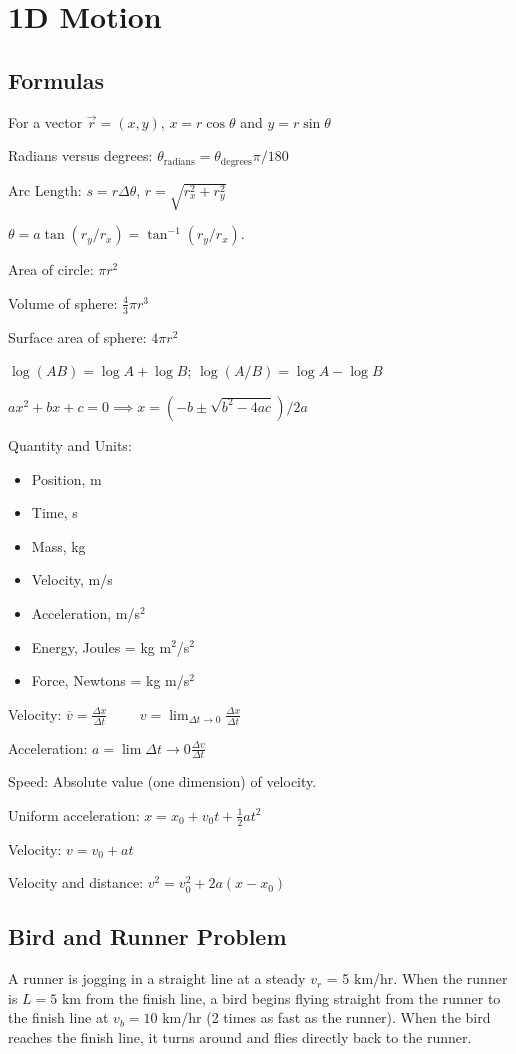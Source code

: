 \documentclass[../physics12.tex]{subfiles}
\begin{document}
\chapter{1D Motion}
\section{Formulas}
For a vector $\vec{r}=(x,y)$, $x=r\cos\theta$ and $y=r\sin\theta$

Radians versus degrees: $\theta_{\text{radians}}=\theta_{\text{degrees}}\pi/180$

Arc Length: $s=r\Delta \theta$, $r=\sqrt{r_x^2+r_y^2}$

$\theta = a\tan(r_y/r_x) = \tan^{-1}(r_y/r_x)$. 

Area of circle: $\pi r^2$

Volume of sphere: $\frac{4}{3}\pi r^3$

Surface area of sphere: $4\pi r^2$

$\log(AB)=\log A + \log B$; $\log(A/B)=\log A-\log B$

$ax^2+bx+c = 0 \implies x = (-b\pm \sqrt{b^2-4ac})/2a$

Quantity and Units:
\begin{itemize}
    \item Position, m 
    \item Time, s 
    \item Mass, kg 
    \item Velocity, m/s 
    \item Acceleration, m/s$^2$
    \item Energy, Joules = kg m$^2$/s$^2$
    \item Force, Newtons = kg m/s$^2$
\end{itemize}

Velocity: $\overline{v}=\frac{\Delta x}{\Delta t} \qquad $ $v=\lim_{\Delta t \to 0}\frac{\Delta x}{\Delta t}$

Acceleration: $a = \lim{\Delta t \to 0}\frac{\Delta v}{\Delta t}$

Speed: Absolute value (one dimension) of velocity. 

Uniform acceleration: $x=x_0+v_0t+\frac{1}{2}at^2$

Velocity: $v=v_0+at$

Velocity and distance: $v^2=v_0^2+2a(x-x_0)$
\section{Bird and Runner Problem}
A runner is jogging in a straight line at a steady $v_r$ = 5 km/hr. When the runner is $L=5$ km from the finish line, 
a bird begins flying straight from the runner to the finish line at $v_b=10$ km/hr (2 times as fast as the runner). When the bird reaches 
the finish line, it turns around and flies directly back to the runner.
\end{document}
